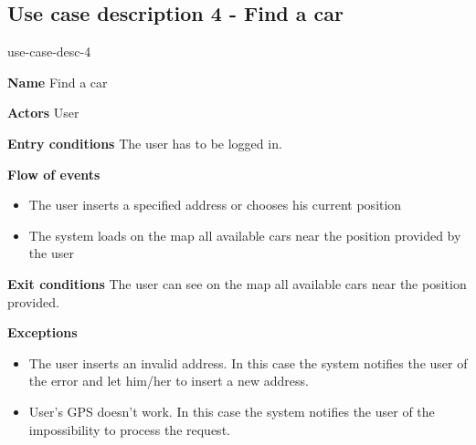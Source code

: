 \subsection{Use case description 4 - Find a car}
\begin{labeling}{use-case-desc-4}
	\item[\textbf{Name}] Find a car
	\item[\textbf{Actors}] User
	\item[\textbf{Entry conditions}] The user has to be logged in.
	\item[\textbf{Flow of events}]
		\begin{itemize}
			\item[]
			\item The user inserts a specified address or chooses his current position
			\item The system loads on the map all available cars near the position provided by the user
		\end{itemize}
	\item[\textbf{Exit conditions}] The user can see on the map all available cars near the position provided. 
	\item[\textbf{Exceptions}]
		\begin{itemize}
			\item[]
			\item The user inserts an invalid address. In this case the system notifies the user of the error and let him/her to insert a new address.
			\item User’s GPS doesn’t work. In this case the system notifies the user of the impossibility to process the request.
		\end{itemize}
\end{labeling}

